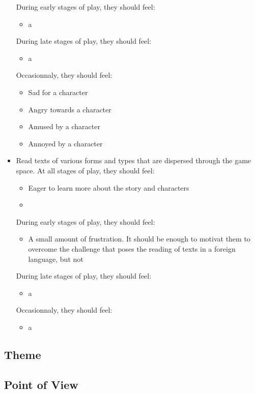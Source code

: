 \documentclass{scrartcl}
\begin{document}
\begin{itemize}
\begin{itemize}
			\end{itemize}
			During early stages of play, they should feel: 
			\begin{itemize}
				\item a
			\end{itemize}
			During late stages of play, they should feel:
			\begin{itemize}
				\item a
			\end{itemize}
			Occasionnaly, they should feel:
			\begin{itemize}
				\item Sad for a character
				\item Angry towards a character
				\item Amused by a character
				\item Annoyed by a character
			\end{itemize}
			\item Read texts of various forms and types that are dispersed through the game space.
			At all stages of play, they should feel:
			\begin{itemize}
				\item Eager to learn more about the story and characters
				\item 
			\end{itemize}
			During early stages of play, they should feel: 
			\begin{itemize}
				\item A small amount of frustration. It should be enough to motivat them to overcome the challenge that poses the reading of texts in a foreign language, but not 
			\end{itemize}
			During late stages of play, they should feel:
			\begin{itemize}
				\item a
			\end{itemize}
			Occasionnaly, they should feel:
			\begin{itemize}
				\item a
			\end{itemize}
			
		\end{itemize}
		\subsection{Theme}
		\subsection{Point of View}
\end{document}
